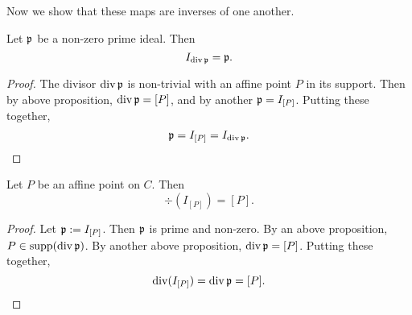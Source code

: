 Now we show that these maps are inverses of one another.

\begin{proposition}
  Let $\frak p$ be a non-zero prime ideal. Then
  \[ I_{\div \frak p} = \frak p. \]
\end{proposition}
\begin{proof}
  The divisor $\div \frak p$ is non-trivial with an affine point $P$ in its support.
  Then by above proposition, $\div \frak p = [P]$,
  and by another $\frak p = I_{[P]}$.
  Putting these together,
  \[ \frak p = I_{[P]} = I_{\div \frak p}. \]
\end{proof}

\begin{proposition}
  Let $P$ be an affine point on $C$. Then
  \[ \div(I_{[P]}) = [P]. \]
\end{proposition}
\begin{proof}
  Let $\frak p := I_{[P]}$.
  Then $\frak p$ is prime and non-zero.
  By an above proposition, $P \in \supp(\div \frak p)$.
  By another above proposition, $\div \frak p = [P]$.
  Putting these together,
  \[ \div(I_{[P]}) = \div \frak p = [P]. \]
\end{proof}


